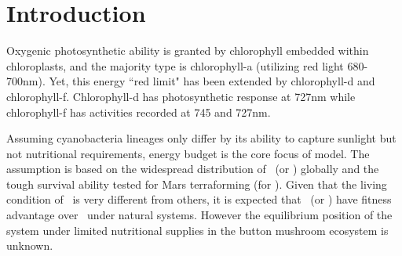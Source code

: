 \documentclass[../thesis.tex]{subfiles} %
\begin{document}
\section{Introduction}
  Oxygenic photosynthetic ability is granted by chlorophyll embedded within chloroplasts, and the majority type is chlorophyll-a (utilizing red light 680-700nm).  Yet, this energy ``red limit" has been extended by chlorophyll-d and chlorophyll-f.  Chlorophyll-d has photosynthetic response at 727nm while chlorophyll-f has activities recorded at 745 and 727nm.
  
  Assuming cyanobacteria lineages only differ by its ability to capture sunlight but not nutritional requirements,\autocite{giraldo2014plant} energy budget is the core focus of model.  The assumption is based on the widespread distribution of \Ss\ (or \As) globally\autocite{sawa2017electricity,joshi2018bacterial} and the tough survival ability tested for Mars terraforming (for \Cs).\autocite{baque2013boss}  Given that the living condition of \Ct\ is very different from others,\autocite{nurnberg2018photochemistry} it is expected that \As\ (or \Ss) have fitness advantage over \Cs\ under natural systems.  However the equilibrium position of the system under limited nutritional supplies in the button mushroom ecosystem\autocite{joshi2018bacterial} is unknown.
\end{document}
